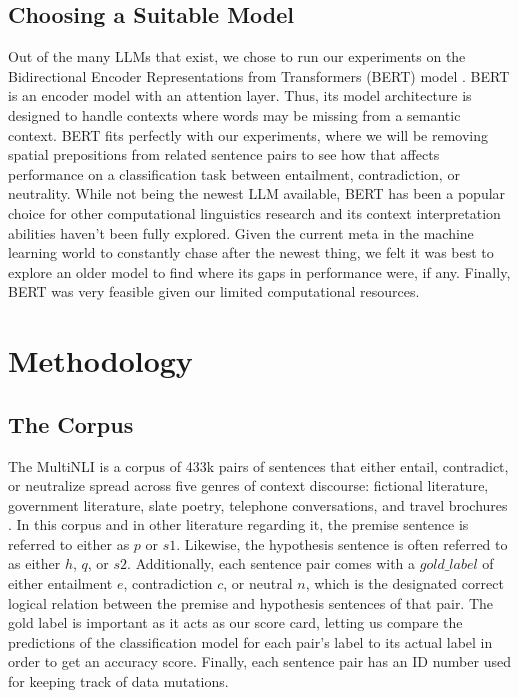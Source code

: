 \documentclass[12pt,letterpaper]{article}
\begin{document}
\subsection{Choosing a Suitable Model}
Out of the many LLMs that exist, we chose to run our experiments on the Bidirectional Encoder Representations from Transformers (BERT) model \citep{devlin_bert}. BERT is an encoder model with an attention layer. Thus, its model architecture is designed to handle contexts where words may be missing from a semantic context. BERT fits perfectly with our experiments, where we will be removing spatial prepositions from related sentence pairs to see how that affects performance on a classification task between entailment, contradiction, or neutrality. While not being the newest LLM available, BERT has been a popular choice for other computational linguistics research and its context interpretation abilities haven't been fully explored. Given the current meta in the machine learning world to constantly chase after the newest thing, we felt it was best to explore an older model to find where its gaps in performance were, if any. Finally, BERT was very feasible given our limited computational resources.  




 
\section{Methodology}
\subsection{The Corpus}
The MultiNLI is a corpus of 433k pairs of sentences that either entail, contradict, or neutralize spread across five genres of context discourse: fictional literature, government literature, slate poetry, telephone conversations, and travel brochures \citep{williams_bowman_multinli}. In this corpus and in other literature regarding it, the premise sentence is referred to either as $p$ or $s1$. Likewise, the hypothesis sentence is often referred to as either $h$, $q$, or $s2$. Additionally, each sentence pair comes with a $gold\_label$ of either entailment $e$, contradiction $c$, or neutral $n$, which is the designated correct logical relation between the premise and hypothesis sentences of that pair. The gold label is important as it acts as our score card, letting us compare the predictions of the classification model for each pair's label to its actual label in order to get an accuracy score. Finally, each sentence pair has an ID number used for keeping track of data mutations. 
\end{document}
